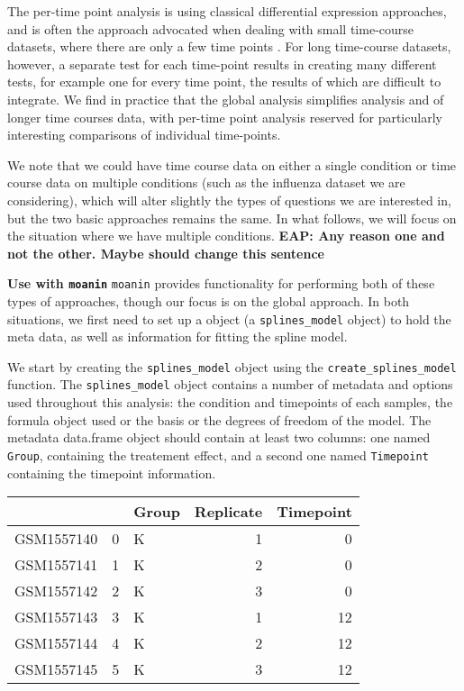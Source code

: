\documentclass[9pt,a4paper,]{extarticle}
\begin{document}
The per-time point analysis is using classical differential expression
approaches, and is often the approach advocated when dealing with small
time-course datasets, where there are only a few time points
\citep[\citet{robinson:edgeR}, \citet{love:moderated}]{ritchie:limma} . For long time-course datasets,
however, a separate test for each time-point results in creating many
different tests, for example one for every time point, the results of which
are difficult to integrate. We find in practice that the global analysis
simplifies analysis and of longer time courses data, with per-time point
analysis reserved for particularly interesting comparisons of individual
time-points.

We note that we could have time course data on either a single condition or
time course data on multiple conditions (such as the influenza dataset we are
considering), which will alter slightly the types of questions we are
interested in, but the two basic approaches remains the same. In what follows,
we will focus on the situation where we have multiple conditions. \textbf{EAP: Any
reason one and not the other. Maybe should change this sentence}

\textbf{Use with \texttt{moanin}} \texttt{moanin} provides functionality for performing both of
these types of approaches, though our focus is on the global approach. In both
situations, we first need to set up a object (a \texttt{splines\_model} object) to
hold the meta data, as well as information for fitting the spline model.

We start by creating the \texttt{splines\_model} object using the
\texttt{create\_splines\_model} function. The \texttt{splines\_model} object contains a number
of metadata and options used throughout this analysis: the condition and
timepoints of each samples, the formula object used or the basis or the
degrees of freedom of the model. The metadata data.frame object should
contain at least two columns: one named \texttt{Group}, containing the treatement
effect, and a second one named \texttt{Timepoint} containing the timepoint
information.

\begin{tabular}{l|r|l|r|r}
\hline
  &  & Group & Replicate & Timepoint\\
\hline
GSM1557140 & 0 & K & 1 & 0\\
\hline
GSM1557141 & 1 & K & 2 & 0\\
\hline
GSM1557142 & 2 & K & 3 & 0\\
\hline
GSM1557143 & 3 & K & 1 & 12\\
\hline
GSM1557144 & 4 & K & 2 & 12\\
\hline
GSM1557145 & 5 & K & 3 & 12\\
\hline
\end{tabular}
\end{document}
